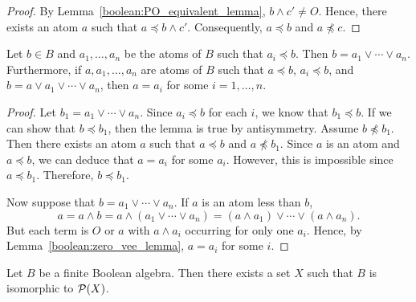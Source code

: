 
\begin{proof}
By  Lemma~\ref{boolean:PO_equivalent_lemma}, $b \wedge c' \neq O$. Hence, there exists an
atom $a$ such that $a \preceq b \wedge c'$. Consequently, $a \preceq
b$ and $a \not\preceq c$.
\end{proof}
 
 
\begin{lemma}\label{boolean:atoms_lemma}
Let $b \in B$ and $a_1, \ldots, a_n$ be the atoms of $B$ such that
$a_i \preceq b$. Then $b = a_1 \vee \cdots \vee a_n$. Furthermore, if
$a, a_1, \ldots, a_n$ are atoms of $B$ such that $a \preceq b$, $a_i
\preceq b$, and $b = a \vee a_1 \vee \cdots \vee a_n$, then $a = a_i$
for some $i = 1, \ldots, n$.    
\end{lemma} 
 
 
\begin{proof}
Let $b_1 =   a_1 \vee \cdots \vee a_n$. Since $a_i \preceq b$ for each
$i$, we know that $b_1 \preceq b$.  If we can show that $b \preceq
b_1$, then the lemma is true by antisymmetry.  Assume $b \not\preceq
b_1$. Then there exists an atom $a$ such that $a \preceq b$ and $a
\not\preceq b_1$.  Since $a$ is an atom and $a \preceq b$, we can
deduce that $a = a_i$ for  some $a_i$. However, this is impossible
since $a \preceq b_1$. Therefore, $b \preceq b_1$. 
 
 
Now suppose that $b = a_1 \vee \cdots \vee a_n$. If $a$ is an atom
less than $b$, 
\[
a 
= a \wedge b 
= a \wedge( a_1 \vee \cdots \vee a_n ) 
= (a \wedge a_1) \vee \cdots \vee ( a \wedge a_n ).
\]
But each term is $O$ or $a$ with $a \wedge a_i$ occurring for only one
$a_i$. Hence, by Lemma~\ref{boolean:zero_vee_lemma}, $a = a_i$ for some $i$.
\end{proof}
 
 
\begin{theorem}
Let $B$ be a finite Boolean algebra.  Then there exists a set $X$ such
that $B$ is isomorphic to ${\cal P}(X)$. 
\end{theorem} 
 
